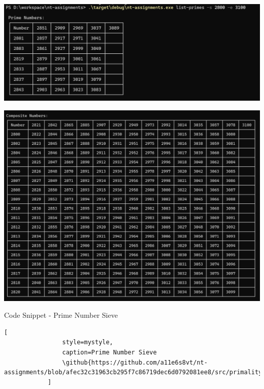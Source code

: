 \documentclass[11pt,a4paper]{article}
\newcommand{\github}[1]{%
	\href{#1}{\faGithubSquare}%
}
\begin{document}
\begin{enumerate}[1.]
\begin{flushleft}
			\begin{minipage}{\linewidth}
				\begin{center}
					\includegraphics[scale=.45]{primes.png}
					\label{figure1:primes}
				\end{center}
			\end{minipage}
			
			\bigbreak
			\bigbreak
			\begin{minipage}{\linewidth}
				\begin{center}
				\includegraphics[scale=.45]{composites.png}
				\label{figure2:composites}
				\end{center}
			\end{minipage}
			
			\bigbreak
			\bigbreak
			Code Snippet - Prime Number Sieve
			\begin{lstlisting}[
				style=mystyle, 
				caption=Prime Number Sieve
				\github{https://github.com/a11e6s8vt/nt-assignments/blob/afec32c31963cb295f7c86719dec6d0792081ee8/src/primality.rs\#L57}        
			]


\end{lstlisting}
\end{flushleft}
\end{enumerate}
\end{document}

